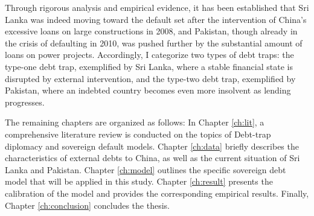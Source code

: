 Through rigorous analysis and empirical evidence, it has been established that
Sri Lanka was indeed moving toward the default set after the intervention of China's excessive loans on large constructions in 2008, and Pakistan, though already in the crisis of defaulting in 2010, was pushed further by the substantial amount of loans on power projects.
Accordingly, I categorize two types of debt traps: the type-one debt trap, exemplified by Sri Lanka, where a stable financial state is disrupted by external intervention, and the type-two debt trap, exemplified by Pakistan, where an indebted country becomes even more insolvent as lending progresses.

The remaining chapters are organized as follows:
In Chapter \ref{ch:lit}, a comprehensive literature review is conducted on the topics of Debt-trap diplomacy and sovereign default models.
Chapter \ref{ch:data} briefly describes the characteristics of external debts to China, as well as the current situation of Sri Lanka and Pakistan.
Chapter \ref{ch:model} outlines the specific sovereign debt model that will be applied in this study.
Chapter \ref{ch:result} presents the calibration of the model and provides the corresponding empirical results.
Finally, Chapter \ref{ch:conclusion} concludes the thesis.


